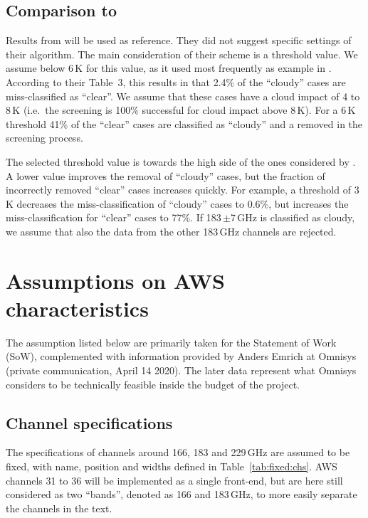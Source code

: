 \documentclass[12pt]{article}
\begin{document}
\subsection{Comparison to \citet{rekha2012potential}}
\label{sec:rekha}
%
Results from \citet{rekha2012potential} will be used as reference. They did not
suggest specific settings of their algorithm. The main consideration of their
scheme is a threshold value. We assume below 6\,K for
this value, as it used most frequently as example in
\citet{rekha2012potential}. According to their Table~3, this results in that
2.4\% of the ``cloudy'' cases are miss-classified as ``clear''. We assume that
these cases have a cloud impact of 4 to 8\,K (i.e.\ the screening is 100\%
successful for cloud impact above 8\,K). For a 6\,K threshold 41\% of the
``clear'' cases are classified as ``cloudy'' and a removed in the screening
process. 

The selected threshold value is towards the high side of the ones considered by 
\citet{rekha2012potential}. A lower value improves the removal of ``cloudy'' cases,
but the fraction of incorrectly removed ``clear'' cases increases quickly. For
example, a threshold of 3\,K decreases the miss-classification of ``cloudy''
cases to 0.6\%, but increases the miss-classification for ``clear'' cases to 77\%.
If 183\,$\pm$7\,GHz is classified as cloudy, we assume that also the data from
the other 183\,GHz channels are rejected.



\section{Assumptions on AWS characteristics}
%
The assumption listed below are primarily taken for the Statement of Work
(SoW), complemented with information provided by Anders Emrich at Omnisys
(private communication, April 14 2020). The later data represent what Omnisys
considers to be technically feasible inside the budget of the project.

\subsection{Channel specifications}
%
The specifications of channels around 166, 183 and 229\,GHz are assumed to
be fixed, with name, position and widths defined in Table~\ref{tab:fixed:chs}.
AWS channels 31 to 36 will be implemented as a single front-end, but are here
still considered as two ``bands'', denoted as 166 and 183\,GHz, to more easily
separate the channels in the text. 
\end{document}
